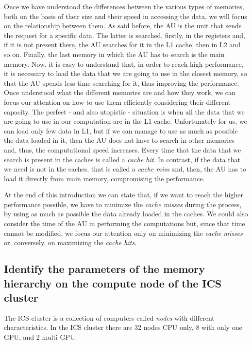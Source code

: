 \documentclass[unicode,11pt,a4paper,oneside,numbers=endperiod,openany]{scrartcl}
\begin{document}
Once we have understood the differences between the various types of memories, both on the basis of their size and their speed in accessing the data, we will focus on the relationship between them. As said before, the AU is the unit that sends the request for a specific data. The latter is searched, firstly, in the registers and, if it is not present there, the AU searches for it in the L1 cache, then in L2 and so on. Finally, the last memory in which the AU has to search is the main memory. Now, it is easy to understand that, in order to reach high performance, it is necessary to load the data that we are going to use in the closest memory, so that the AU spends less time searching for it, thus improving the performance. Once understood what the different memories are and how they work, we can focus our attention on how to use them efficiently considering their different capacity. The perfect - and also utopistic - situation is when all the data that we are going to use in our computation are in the L1 cache. Unfortunately for us, we can load only few data in L1, but if we can manage to use as much as possible the data loaded in it, then the AU does not have to search in other memories and, thus, the computational speed increases. Every time that the data that we search is present in the caches is called a \textit{cache hit}. In contrast, if the data that we need is not in the caches, that is called a \textit{cache miss} and, then, the AU has to load it directly from main memory, compromising the performance.

At the end of this introduction we can state that, if we want to reach the higher performance possible, we have to minimize the \textit{cache misses} during the process, by using as much as possible the data already loaded in the caches. We could also consider the time of the AU in performing the computations but, since that time cannot be modified, we focus our attention only on minimizing the \textit{cache misses} or, conversely, on maximizing the \textit{cache hits}.

\subsection{Identify the parameters of the memory hierarchy on the compute node of the ICS cluster}
The ICS cluster is a collection of computers called \textit{nodes} with different characteristics. In the ICS cluster there are 32 nodes CPU only, 8 with only one GPU, and 2 multi GPU. 
\end{document}
